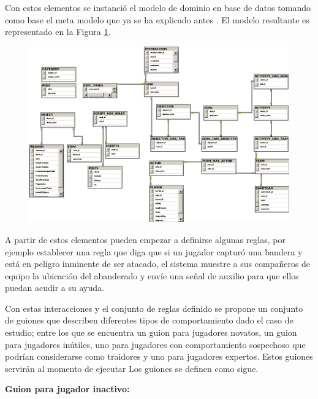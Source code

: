 Con estos elementos se instanci\'o el modelo de dominio en base de datos tomando como base el meta modelo que ya se ha explicado antes \cite{montane2013context}. El modelo resultante es representado en la Figura \ref{fig:DomModel}.

\begin{figure}[h]
\centering
\includegraphics[width=0.7\linewidth]{./images/GameModelDiagram}
\caption[Modelo de dominio de \textit{Assault Cube}]{}
\caption{}
\label{fig:DomModel}
\end{figure}


A partir de estos elementos pueden empezar a definirse algunas reglas, por ejemplo establecer una regla que diga que si un jugador captur\'o una bandera y est\'a en peligro inminente de ser atacado, el sistema muestre a sus compa\~neros de equipo la ubicaci\'on del abanderado y env\'ie una se\~nal de auxilio para que ellos puedan acudir a su ayuda.

Con estas interacciones y el conjunto de reglas definido se propone un conjunto de guiones que describen diferentes tipos de comportamiento dado el caso de estudio; entre los que se encuentra un guion para jugadores novatos, un guion para jugadores in\'utiles, uno para jugadores con comportamiento sospechoso que podr\'ian considerarse como traidores y uno para jugadores expertos. Estos guiones servir\'an al momento de ejecutar  Los guiones se definen como sigue.

\textbf{Guion para jugador inactivo:}

